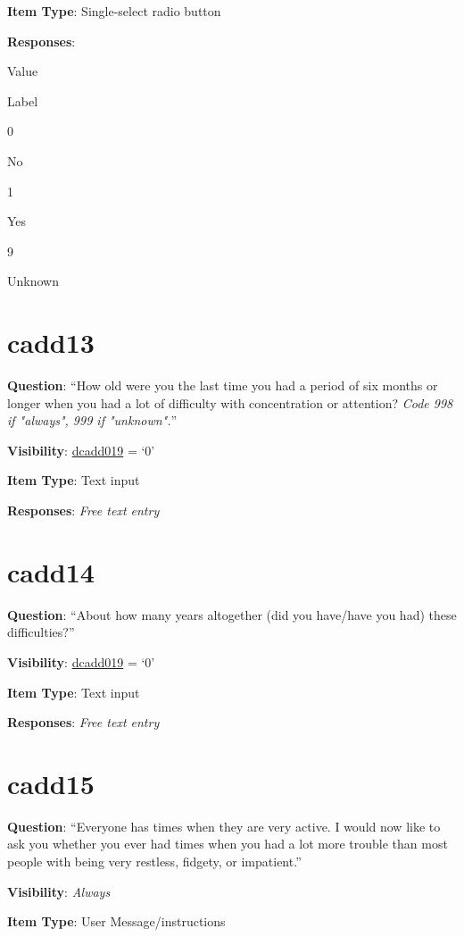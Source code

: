 \documentclass[]{book}
\begin{document}
\textbf{Item Type}: Single-select radio button

\textbf{Responses}:

Value

Label

0

No

1

Yes

9

Unknown

\hypertarget{cadd13}{%
\section{cadd13}\label{cadd13}}

\textbf{Question}: ``How old were you the last time you had a period of six months or longer when you had a lot of difficulty with concentration or attention? \emph{Code 998 if "always", 999 if "unknown".}''

\textbf{Visibility}: \protect\hyperlink{dcadd019}{dcadd019} = `0'

\textbf{Item Type}: Text input

\textbf{Responses}: \emph{Free text entry}

\hypertarget{cadd14}{%
\section{cadd14}\label{cadd14}}

\textbf{Question}: ``About how many years altogether (did you have/have you had) these difficulties?''

\textbf{Visibility}: \protect\hyperlink{dcadd019}{dcadd019} = `0'

\textbf{Item Type}: Text input

\textbf{Responses}: \emph{Free text entry}

\hypertarget{cadd15}{%
\section{cadd15}\label{cadd15}}

\textbf{Question}: ``Everyone has times when they are very active. I would now like to ask you whether you ever had times when you had a lot more trouble than most people with being very restless, fidgety, or impatient.''

\textbf{Visibility}: \emph{Always}

\textbf{Item Type}: User Message/instructions
\end{document}
